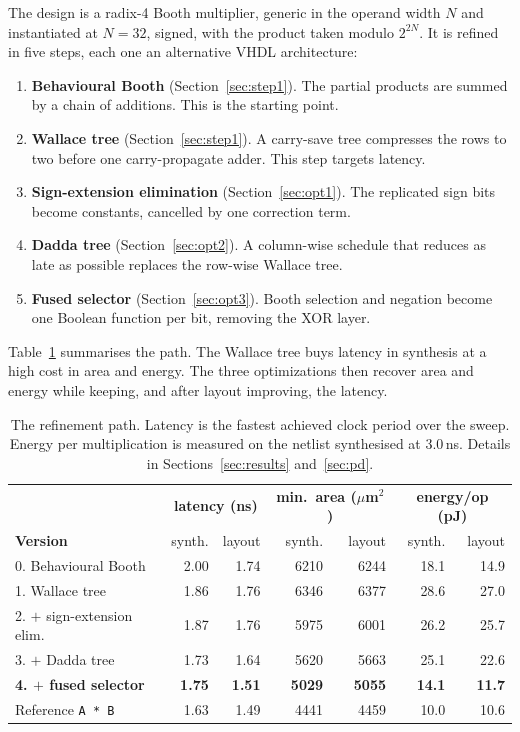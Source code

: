 \documentclass[11pt,a4paper]{article}
\begin{document}
The design is a radix-4 Booth multiplier, generic in the operand width $N$ and
instantiated at $N=32$, signed, with the product taken modulo $2^{2N}$. It is
refined in five steps, each one an alternative VHDL architecture:

\begin{enumerate}\itemsep2pt
\setcounter{enumi}{-1}
\item \textbf{Behavioural Booth} (Section~\ref{sec:step1}). The partial
      products are summed by a chain of additions. This is the starting point.
\item \textbf{Wallace tree} (Section~\ref{sec:step1}). A carry-save tree
      compresses the rows to two before one carry-propagate adder. This step
      targets latency.
\item \textbf{Sign-extension elimination} (Section~\ref{sec:opt1}). The
      replicated sign bits become constants, cancelled by one correction term.
\item \textbf{Dadda tree} (Section~\ref{sec:opt2}). A column-wise schedule
      that reduces as late as possible replaces the row-wise Wallace tree.
\item \textbf{Fused selector} (Section~\ref{sec:opt3}). Booth selection and
      negation become one Boolean function per bit, removing the XOR layer.
\end{enumerate}

Table~\ref{tab:path} summarises the path. The Wallace tree buys latency in
synthesis at a high cost in area and energy. The three optimizations then
recover area and energy while keeping, and after layout improving, the
latency.

\begin{table}[!ht]
\centering\small
\begin{tabular}{@{}lrrrrrr@{}}
\toprule
 & \multicolumn{2}{c}{\textbf{latency (ns)}} & \multicolumn{2}{c}{\textbf{min.\ area ($\mu$m$^2$)}} & \multicolumn{2}{c}{\textbf{energy/op (pJ)}} \\
\textbf{Version} & synth. & layout & synth. & layout & synth. & layout \\
\midrule
0. Behavioural Booth            & 2.00 & 1.74 & 6210 & 6244 & 18.1 & 14.9 \\
1. Wallace tree                 & 1.86 & 1.76 & 6346 & 6377 & 28.6 & 27.0 \\
2. $+$ sign-extension elim.     & 1.87 & 1.76 & 5975 & 6001 & 26.2 & 25.7 \\
3. $+$ Dadda tree               & 1.73 & 1.64 & 5620 & 5663 & 25.1 & 22.6 \\
\textbf{4. $+$ fused selector}  & \textbf{1.75} & \textbf{1.51} & \textbf{5029} & \textbf{5055} & \textbf{14.1} & \textbf{11.7} \\
\midrule
Reference \texttt{A * B}        & 1.63 & 1.49 & 4441 & 4459 & 10.0 & 10.6 \\
\bottomrule
\end{tabular}
\caption{The refinement path. Latency is the fastest achieved clock period over
the sweep. Energy per multiplication is measured on the netlist synthesised at
$3.0$\,ns. Details in Sections~\ref{sec:results} and~\ref{sec:pd}.}
\label{tab:path}
\end{table}
\end{document}
